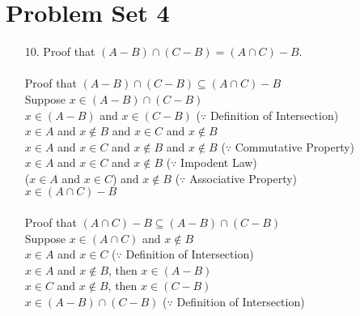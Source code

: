 \documentclass[12pt]{article}
\begin{document}
\section*{Problem Set 4}
\begin{itemize}
    \item [10.]
        Proof that $(A - B) \cap (C - B) = (A \cap C) - B$. \\
        \\
        Proof that $(A - B) \cap (C - B) \subseteq (A \cap C) - B$ \\
        Suppose $x \in (A - B) \cap (C - B)$ \\
        $x \in (A - B)$ and $x \in (C - B)$ \hspace{3em}
            ($\because$ Definition of Intersection) \\
        $x \in A$ and $x \notin B$ and $x \in C$ and $x \notin B$ \\
        $x \in A$ and $x \in C$ and $x \notin B$ and $x \notin B$ \hspace{2em}
            ($\because$ Commutative Property) \\
        $x \in A$ and $x \in C$ and $x \notin B$ \hspace{2em} ($\because$ Impodent Law) \\
        ($x \in A$ and $x \in C$) and $x \notin B$ \hspace{2em} ($\because$
            Associative Property) \\
        $x \in (A \cap C) - B$ \\
        \\
        Proof that $(A \cap C) - B \subseteq (A - B) \cap (C - B)$ \\
        Suppose $x \in (A \cap C)$ and $x \notin B$ \\
        $x \in A$ and $x \in C$ \hspace{6em} ($\because$ Definition of Intersection) \\
        $x \in A$ and $x \notin B$, then $x \in (A - B)$ \\
        $x \in C$ and $x \notin B$, then $x \in (C - B)$ \\
        $x \in (A - B) \cap (C - B)$ \hspace{4em} ($\because$ Definition of Intersection)\\
\end{itemize}
\end{document}
